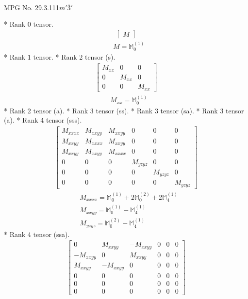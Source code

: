 \documentclass[fleqn,8pt,landscape]{jsarticle}
\begin{document}
\setcounter{MaxMatrixCols}{32}

\renewcommand{\tablename}{Table~}
\renewcommand{\figurename}{Figure~}
\begin{center}
\LARGE
MPG No. 29.3.111\quad$m'\bar{3}'$
\end{center}
* Rank 0 tensor.
\begin{align*}
\begin{bmatrix} M \end{bmatrix}
\end{align*}
\begin{align*}
& M = \mathbb{M}_{0}^{(1)}
\end{align*}
* Rank 1 tensor.
* Rank 2 tensor (s).
\begin{align*}
\begin{bmatrix} M_{xx} & 0 & 0 \\ 0 & M_{xx} & 0 \\ 0 & 0 & M_{xx} \end{bmatrix}
\end{align*}
\begin{align*}
& M_{xx} = \mathbb{M}_{0}^{(1)}
\end{align*}
* Rank 2 tensor (a).
* Rank 3 tensor (ss).
* Rank 3 tensor (sa).
* Rank 3 tensor (a).
* Rank 4 tensor (sss).
\begin{align*}
\begin{bmatrix} M_{xxxx} & M_{xxyy} & M_{xxyy} & 0 & 0 & 0 \\ M_{xxyy} & M_{xxxx} & M_{xxyy} & 0 & 0 & 0 \\ M_{xxyy} & M_{xxyy} & M_{xxxx} & 0 & 0 & 0 \\ 0 & 0 & 0 & M_{yzyz} & 0 & 0 \\ 0 & 0 & 0 & 0 & M_{yzyz} & 0 \\ 0 & 0 & 0 & 0 & 0 & M_{yzyz} \end{bmatrix}
\end{align*}
\begin{align*}
& M_{xxxx} = \mathbb{M}_{0}^{(1)} + 2 \mathbb{M}_{0}^{(2)} + 2 \mathbb{M}_{4}^{(1)} \\
& M_{xxyy} = \mathbb{M}_{0}^{(1)} - \mathbb{M}_{4}^{(1)} \\
& M_{yzyz} = \mathbb{M}_{0}^{(2)} - \mathbb{M}_{4}^{(1)}
\end{align*}
* Rank 4 tensor (ssa).
\begin{align*}
\begin{bmatrix} 0 & M_{xxyy} & - M_{xxyy} & 0 & 0 & 0 \\ - M_{xxyy} & 0 & M_{xxyy} & 0 & 0 & 0 \\ M_{xxyy} & - M_{xxyy} & 0 & 0 & 0 & 0 \\ 0 & 0 & 0 & 0 & 0 & 0 \\ 0 & 0 & 0 & 0 & 0 & 0 \\ 0 & 0 & 0 & 0 & 0 & 0 \end{bmatrix}
\end{align*}
\end{document}
